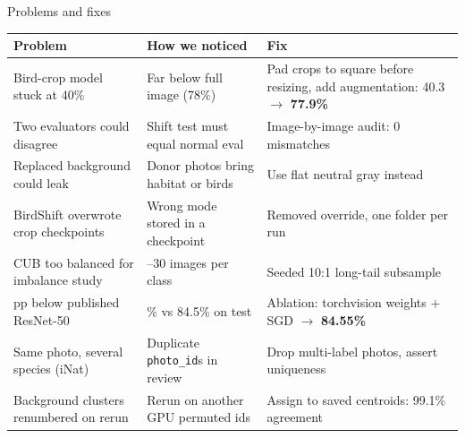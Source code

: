 \documentclass[aspectratio=169,10pt]{beamer}
\begin{document}
\begin{frame}{Problems and fixes}
\footnotesize\renewcommand{\arraystretch}{1.3}
\begin{tabularx}{\linewidth}{@{}>{\raggedright\arraybackslash}p{4.1cm} >{\raggedright\arraybackslash}X >{\raggedright\arraybackslash}p{4.6cm}@{}}
\toprule
\textbf{Problem} & \textbf{How we noticed} & \textbf{Fix}\\
\midrule
Bird-crop model stuck at 40\% & Far below full image (78\%) & Pad crops to square before resizing, add augmentation: 40.3 $\to$ \textbf{77.9\%}\\
Two evaluators could disagree & Shift test must equal normal eval & Image-by-image audit: 0 mismatches\\
Replaced background could leak & Donor photos bring habitat or birds & Use flat neutral gray instead\\
BirdShift overwrote crop checkpoints & Wrong mode stored in a checkpoint & Removed override, one folder per run\\
CUB too balanced for imbalance study & 25--30 images per class & Seeded 10:1 long-tail subsample\\
4 pp below published ResNet-50 & 80.4\% vs 84.5\% on test & Ablation: torchvision weights + SGD $\to$ \textbf{84.55\%}\\
Same photo, several species (iNat) & Duplicate \texttt{photo\_id}s in review & Drop multi-label photos, assert uniqueness\\
Background clusters renumbered on rerun & Rerun on another GPU permuted ids & Assign to saved centroids: 99.1\% agreement\\
\bottomrule
\end{tabularx}
\end{frame}
\end{document}
